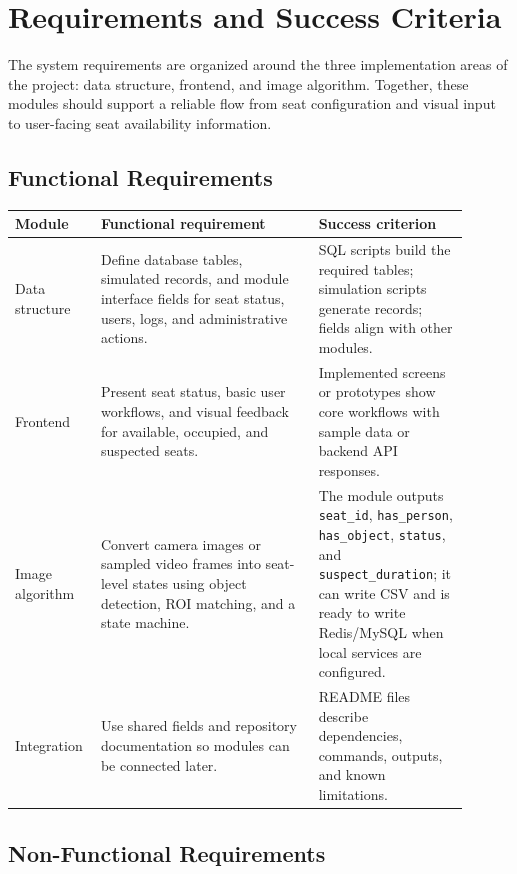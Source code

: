 \section{Requirements and Success Criteria}

The system requirements are organized around the three implementation areas of the project: data structure, frontend, and image algorithm. Together, these modules should support a reliable flow from seat configuration and visual input to user-facing seat availability information.

\subsection{Functional Requirements}

\begin{longtable}{|p{0.14\linewidth}|p{0.45\linewidth}|p{0.31\linewidth}|}
\hline
\textbf{Module} & \textbf{Functional requirement} & \textbf{Success criterion} \\
\hline
Data structure & Define database tables, simulated records, and module interface fields for seat status, users, logs, and administrative actions. & SQL scripts build the required tables; simulation scripts generate records; fields align with other modules. \\
\hline
Frontend & Present seat status, basic user workflows, and visual feedback for available, occupied, and suspected seats. & Implemented screens or prototypes show core workflows with sample data or backend API responses. \\
\hline
Image algorithm & Convert camera images or sampled video frames into seat-level states using object detection, ROI matching, and a state machine. & The module outputs \texttt{seat\_id}, \texttt{has\_person}, \texttt{has\_object}, \texttt{status}, and \texttt{suspect\_duration}; it can write CSV and is ready to write Redis/MySQL when local services are configured. \\
\hline
Integration & Use shared fields and repository documentation so modules can be connected later. & README files describe dependencies, commands, outputs, and known limitations. \\
\hline
\end{longtable}

\subsection{Non-Functional Requirements}

